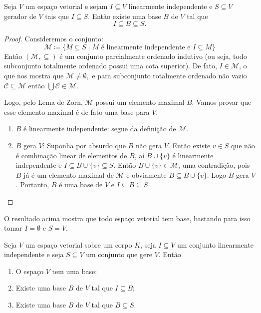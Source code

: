 \documentclass[11pt,twoside,a4paper]{book}
\begin{document}
\begin{teorema}\label{existbase}
Seja $V$ um espaço vetorial e sejam $I\subseteq V$ linearmente independente e $S\subseteq V$ gerador de $V$ tais que $I\subseteq S$. Então existe uma base $B$ de $V$ tal que \[I\subseteq B\subseteq S.\]
\end{teorema}
\begin{proof}
Consideremos o conjunto:
\[
\mathcal{M}\coloneqq\{M\subseteq S\mid M\text{ é linearmente independente e }I\subseteq M\}
\]
Então $(\mathcal{M},\subseteq)$ é um conjunto parcialmente ordenado indutivo (ou seja, todo subconjunto totalmente ordenado possui uma cota superior). De fato, $I\in\mathcal{M}$, o que nos mostra que $\mathcal{M} \neq \emptyset,$ e para subconjunto totalmente ordenado não vazio $\mathcal{C}\subseteq\mathcal{M}$ então $\bigcup\mathcal{C}\in\mathcal{M}.$ 

\medskip
\noindent
Logo, pelo Lema de Zorn, $\mathcal{M}$ possui um elemento maximal $B$. Vamos provar que esse elemento maximal é de fato uma base para $V.$
\begin{enumerate}[label=(\roman*)]
\item $B$ é linearmente independente: segue da definição de $\mathcal{M}.$
\item $B$ gera $V$: Suponha por absurdo que $B$ não gera $V$. Então existe $v\in S$ que não é combinação linear de elementos de $B$, aí $B\cup\{v\}$ é linearmente independente e $I\subseteq B\cup\{v\}\subseteq S$. Então $B\cup\{v\}\in\mathcal{M}$, uma contradição, pois $B$ já é um elemento maximal de $\mathcal{M}$ e obviamente $B\subseteq B\cup\{v\}$. Logo $B$ gera $V$. Portanto, $B$ é uma base de $V$ e $I\subseteq B\subseteq S$.\qedhere
\end{enumerate}
\end{proof}

\noindent
O resultado acima mostra que todo espaço vetorial tem base, bastando para isso tomar $I=\emptyset$ e $S=V.$
\begin{corolario}
Seja $V$ um espaço vetorial sobre um corpo $K$,
seja $I\subseteq V$ um
conjunto linearmente independente e seja $S\subseteq V$
um conjunto que gere $V$. Então
\begin{enumerate}[label=(\roman*)]
\item O espaço $V$ tem uma base;
\item Existe uma base $B$ de $V$ tal que $I\subseteq B$; 
\item Existe uma base $B$ de $V$ tal que $B\subseteq S$.
\end{enumerate}
\end{corolario}
\end{document}
